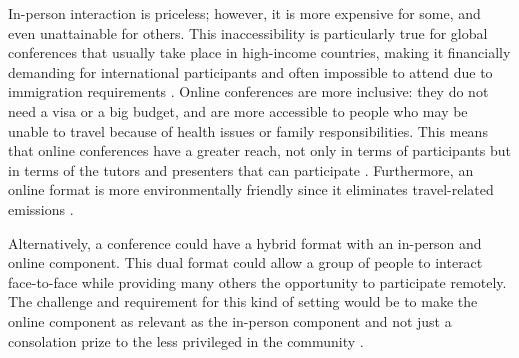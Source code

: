 \documentclass[10pt,letterpaper]{article}
\begin{document}
In-person interaction is priceless; however, it is more expensive for some, and even unattainable for others. This inaccessibility is particularly true for global conferences that usually take place in high-income countries, making it financially demanding for international participants and often impossible to attend due to immigration requirements \cite{arendDisparityConferenceRegistration2019,gewinWhatScientistsShould2019}. Online conferences are more inclusive: they do not need a visa or a big budget, and are more accessible to people who may be unable to travel because of health issues or family responsibilities. This means that online conferences have a greater reach, not only in terms of participants but in terms of the tutors and presenters that can participate \cite{atkinsonJournalMedicine20202021}. Furthermore, an online format is more environmentally friendly since it eliminates travel-related emissions \cite{sarabipourChangingScientificMeetings2021,ninerBetterWhomLeveling2021, gattrellComparisonCarbonCosts2021}.

Alternatively, a conference could have a hybrid format with an in-person and online component. This dual format could allow a group of people to interact face-to-face while providing many others the opportunity to participate remotely. The challenge and requirement for this kind of setting would be to make the online component as relevant as the in-person component and not just a consolation prize to the less privileged in the community \cite{ninerBetterWhomLeveling2021}. %
\end{document}
